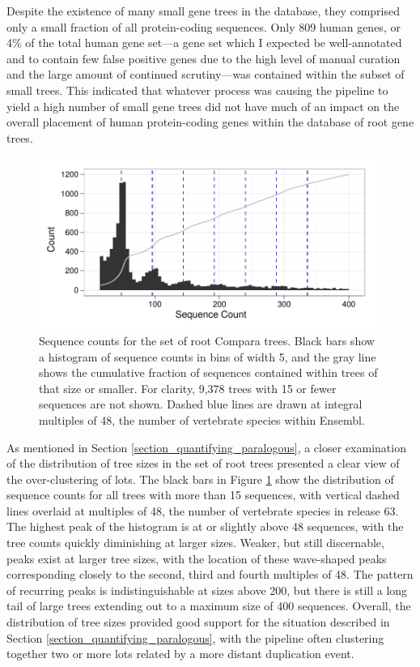Despite the existence of many small gene trees in the \cmp database,
they comprised only a small fraction of all protein-coding
sequences. Only 809 human genes, or 4\% of the total human gene
set---a gene set which I expected be well-annotated and to contain few
false positive genes due to the high level of manual curation and the
large amount of continued scrutiny---was contained within the subset
of small trees. This indicated that whatever process was causing the
\cmp pipeline to yield a high number of small gene trees did not have
much of an impact on the overall placement of human protein-coding
genes within the database of root \cmp gene trees.

\begin{figure}
\centering
\includegraphics[scale=0.9]{Figs/ensembl_roots_hist.pdf}
\caption{Sequence counts for the set of root Compara trees. Black bars
  show a histogram of sequence counts in bins of width 5, and the gray
  line shows the cumulative fraction of sequences contained within
  trees of that size or smaller. For clarity, 9,378 trees with 15 or
  fewer sequences are not shown. Dashed blue lines are drawn at
  integral multiples of 48, the number of vertebrate species within
  Ensembl.}
\label{ensembl_roots_hist}
\end{figure}

As mentioned in Section \ref{section_quantifying_paralogous}, a closer
examination of the distribution of tree sizes in the set of root \cmp
trees presented a clear view of the over-clustering of \mammln
\acp{lot}. The black bars in Figure \ref{ensembl_roots_hist} show the
distribution of sequence counts for all trees with more than 15
sequences, with vertical dashed lines overlaid at multiples of 48, the
number of vertebrate species in \ens release 63. The highest peak of
the histogram is at or slightly above 48 sequences, with the tree
counts quickly diminishing at larger sizes. Weaker, but still
discernable, peaks exist at larger tree sizes, with the location of
these wave-shaped peaks corresponding closely to the second, third and
fourth multiples of 48. The pattern of recurring peaks is
indistinguishable at sizes above 200, but there is still a long tail
of large trees extending out to a maximum size of 400
sequences. Overall, the distribution of tree sizes provided good
support for the situation described in Section
\ref{section_quantifying_paralogous}, with the \cmp pipeline often
clustering together two or more \mammln \acp{lot} related by a more
distant duplication event.

